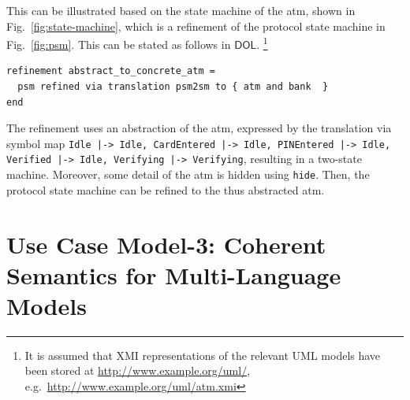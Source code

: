 \documentclass[10pt,fleqn,final]{scrreprt}
\newcommand*{\syntax}[1]{\texttt{#1}}
\newcommand*{\DOL}{\ensuremath{\mathsf{DOL}}\xspace}
\newcommand{\uml}[1]{\textsf{#1}}
\begin{document}
 This can be illustrated based on the state
machine of the \uml{atm}, shown in Fig.~\ref{fig:state-machine}, which is a  
refinement of the protocol state machine in Fig.~\ref{fig:psm}. This can be stated as follows in \DOL. 
\footnote{  It is assumed that XMI representations of the relevant UML models have been 
stored at \url{http://www.example.org/uml/},
e.g.\ \url{http://www.example.org/uml/atm.xmi} } 


\begin{lstlisting}[basicstyle=\ttfamily,language=dolText,escapechar=@,mathescape]
refinement abstract_to_concrete_atm =
  psm refined via translation psm2sm to { atm and bank  }
end
\end{lstlisting}

The refinement uses an abstraction of the \uml{atm}, expressed by the
translation via symbol map \texttt{Idle |-> Idle, CardEntered |-> Idle, PINEntered |-> Idle, Verified |-> Idle, Verifying |-> Verifying}, resulting in a two-state machine. Moreover, some detail of the \uml{atm} is hidden using
\syntax{hide}. Then, the protocol state machine can be refined to
the thus abstracted \uml{atm}.

\section{Use Case Model-3: Coherent Semantics for Multi-Language Models}
\label{model-3}
\end{document}
